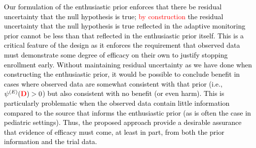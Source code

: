 \documentclass[12pt]{article}
\begin{document}
\textcolor{black}{Our formulation of the enthusiastic prior enforces that there be residual uncertainty that the null hypothesis is true; 
\textcolor{red}{by construction} the residual uncertainty that the null hypothesis is true reflected in the adaptive monitoring prior cannot be less than that reflected in the enthusiastic prior itself. This is a critical feature of the design as it enforces the requirement that observed data must demonstrate some degree of efficacy on their own to justify stopping enrollment early. Without maintaining residual uncertainty as we have done when constructing the enthusiastic prior, it would be possible to conclude benefit in cases where observed data are somewhat consistent with that prior (i.e., $\psi^{(E)}(\textcolor{red}{\mathbf{D}}) > 0$) but also consistent with no benefit (or even harm). This is particularly problematic when the observed data contain little information compared to the source that informs the enthusiastic prior (as is often the case in pediatric settings). Thus, the proposed approach provide a desirable assurance that evidence of efficacy must come, at least in part, from both the prior information and the trial data. 
}
\end{document}
